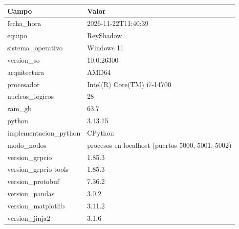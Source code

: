 \begin{tabular}{l l}
\toprule
Campo & Valor \\
\midrule
fecha\_hora & 2026-11-22T11:40:39 \\
equipo & ReyShadow \\
sistema\_operativo & Windows 11 \\
version\_so & 10.0.26300 \\
arquitectura & AMD64 \\
procesador & Intel(R) Core(TM) i7-14700 \\
nucleos\_logicos & 28 \\
ram\_gb & 63.7 \\
python & 3.13.15 \\
implementacion\_python & CPython \\
modo\_nodos & procesos en localhost (puertos 5000, 5001, 5002) \\
version\_grpcio & 1.85.3 \\
version\_grpcio-tools & 1.85.3 \\
version\_protobuf & 7.36.2 \\
version\_pandas & 3.0.2 \\
version\_matplotlib & 3.11.2 \\
version\_jinja2 & 3.1.6 \\
\bottomrule
\end{tabular}
